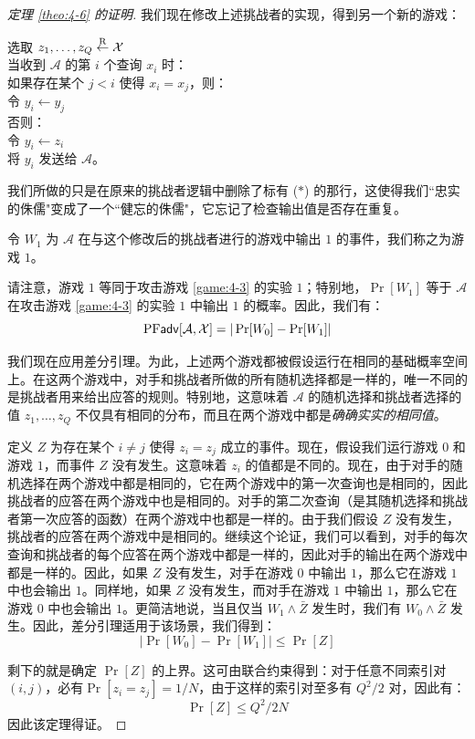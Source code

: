 \begin{proof}[定理 \ref{theo:4-6} 的证明]
我们现在修改上述挑战者的实现，得到另一个新的游戏：

\vspace{5pt}

\hspace*{5pt} 选取 $z_1,\dots,z_Q\overset{\rm R}\leftarrow\mathcal{X}$\\
\hspace*{26pt} 当收到 $\mathcal{A}$ 的第 $i$ 个查询 $x_i$ 时：\\
\hspace*{50pt} 如果存在某个 $j<i$ 使得 $x_i=x_j$，则：\\
\hspace*{75pt} 令 $y_i\leftarrow y_j$\\
\hspace*{50pt} 否则：\\
\hspace*{75pt} 令 $y_i\leftarrow z_i$\\
\hspace*{50pt} 将 $y_i$ 发送给 $\mathcal{A}$。

\vspace{5pt}

我们所做的只是在原来的挑战者逻辑中删除了标有 ($*$) 的那行，这使得我们``忠实的侏儒"变成了一个``健忘的侏儒"，它忘记了检查输出值是否存在重复。

令 $W_1$ 为 $\mathcal{A}$ 在与这个修改后的挑战者进行的游戏中输出 $1$ 的事件，我们称之为游戏 $1$。

请注意，游戏 $1$ 等同于攻击游戏 \ref{game:4-3} 的实验 $1$；特别地，$\Pr[W_1]$ 等于 $\mathcal{A}$ 在攻击游戏 \ref{game:4-3} 的实验 $1$ 中输出 $1$ 的概率。因此，我们有：
\[
{\rm PF\mathsf{adv}}[\mathcal{A},\mathcal{X}]=|\Pr[W_0]-\Pr[W_1]|
\]

我们现在应用差分引理。为此，上述两个游戏都被假设运行在相同的基础概率空间上。在这两个游戏中，对手和挑战者所做的所有随机选择都是一样的，唯一不同的是挑战者用来给出应答的规则。特别地，这意味着 $\mathcal{A}$ 的随机选择和挑战者选择的值 $z_1,\dots,z_Q$ 不仅具有相同的分布，而且在两个游戏中都是\emph{确确实实的相同值}。

定义 $Z$ 为存在某个 $i\neq j$ 使得 $z_i=z_j$ 成立的事件。现在，假设我们运行游戏 $0$ 和游戏 $1$，而事件 $Z$ 没有发生。这意味着 $z_i$ 的值都是不同的。现在，由于对手的随机选择在两个游戏中都是相同的，它在两个游戏中的第一次查询也是相同的，因此挑战者的应答在两个游戏中也是相同的。对手的第二次查询（是其随机选择和挑战者第一次应答的函数）在两个游戏中也都是一样的。由于我们假设 $Z$ 没有发生，挑战者的应答在两个游戏中是相同的。继续这个论证，我们可以看到，对手的每次查询和挑战者的每个应答在两个游戏中都是一样的，因此对手的输出在两个游戏中都是一样的。因此，如果 $Z$ 没有发生，对手在游戏 $0$ 中输出 $1$，那么它在游戏 $1$ 中也会输出 $1$。同样地，如果 $Z$ 没有发生，而对手在游戏 $1$ 中输出 $1$，那么它在游戏 $0$ 中也会输出 $1$。更简洁地说，当且仅当 $W_1\land\bar{Z}$ 发生时，我们有 $W_0\land\bar{Z}$ 发生。因此，差分引理适用于该场景，我们得到：
\[
|\Pr[W_0]-\Pr[W_1]|\leq\Pr[Z]
\]

剩下的就是确定 $\Pr[Z]$ 的上界。这可由联合约束得到：对于任意不同索引对 $(i,j)$，必有$\Pr[z_i=z_j]={1}/{N}$，由于这样的索引对至多有 ${Q^2}/{2}$ 对，因此有：
\[
\Pr[Z]\leq{Q^2}/{2N}
\]
因此该定理得证。
\end{proof}

